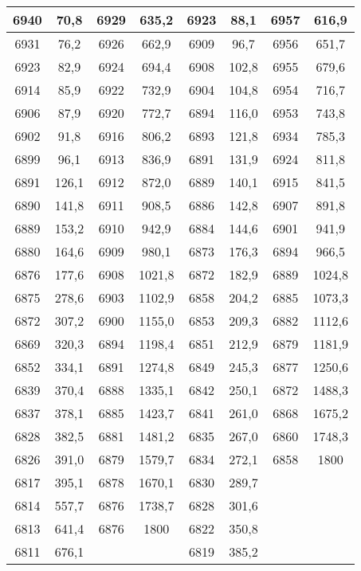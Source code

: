 \documentclass[11pt]{article}
\begin{document}
{{\begin{tabular}{|c|c|c|c|c|c|c|c|}
            \hline 
            6940 & 70,8 & 6929 & 635,2 & 6923 & 88,1 & 6957 & 616,9\tabularnewline
            \hline 
            6931 & 76,2 & 6926 & 662,9 & 6909 & 96,7 & 6956 & 651,7\tabularnewline
            \hline 
            6923 & 82,9 & 6924 & 694,4 & 6908 & 102,8 & 6955 & 679,6\tabularnewline
            \hline 
            6914 & 85,9 & 6922 & 732,9 & 6904 & 104,8 & 6954 & 716,7\tabularnewline
            \hline 
            6906 & 87,9 & 6920 & 772,7 & 6894 & 116,0 & 6953 & 743,8\tabularnewline
            \hline 
            6902 & 91,8 & 6916 & 806,2 & 6893 & 121,8 & 6934 & 785,3\tabularnewline
            \hline 
            6899 & 96,1 & 6913 & 836,9 & 6891 & 131,9 & 6924 & 811,8\tabularnewline
            \hline 
            6891 & 126,1 & 6912 & 872,0 & 6889 & 140,1 & 6915 & 841,5\tabularnewline
            \hline 
            6890 & 141,8 & 6911 & 908,5 & 6886 & 142,8 & 6907 & 891,8\tabularnewline
            \hline 
            6889 & 153,2 & 6910 & 942,9 & 6884 & 144,6 & 6901 & 941,9\tabularnewline
            \hline 
            6880 & 164,6 & 6909 & 980,1 & 6873 & 176,3 & 6894 & 966,5\tabularnewline
            \hline 
            6876 & 177,6 & 6908 & 1021,8 & 6872 & 182,9 & 6889 & 1024,8\tabularnewline
            \hline 
            6875 & 278,6 & 6903 & 1102,9 & 6858 & 204,2 & 6885 & 1073,3\tabularnewline
            \hline 
            6872 & 307,2 & 6900 & 1155,0 & 6853 & 209,3 & 6882 & 1112,6\tabularnewline
            \hline 
            6869 & 320,3 & 6894 & 1198,4 & 6851 & 212,9 & 6879 & 1181,9\tabularnewline
            \hline 
            6852 & 334,1 & 6891 & 1274,8 & 6849 & 245,3 & 6877 & 1250,6\tabularnewline
            \hline 
            6839 & 370,4 & 6888 & 1335,1 & 6842 & 250,1 & 6872 & 1488,3\tabularnewline
            \hline 
            6837 & 378,1 & 6885 & 1423,7 & 6841 & 261,0 & 6868 & 1675,2\tabularnewline
            \hline 
            6828 & 382,5 & 6881 & 1481,2 & 6835 & 267,0 & 6860 & 1748,3\tabularnewline
            \hline 
            6826 & 391,0 & 6879 & 1579,7 & 6834 & 272,1 & 6858 & 1800\tabularnewline
            \hline 
            6817 & 395,1 & 6878 & 1670,1 & 6830 & 289,7 & \multicolumn{1}{c}{} & \multicolumn{1}{c}{}\tabularnewline
            \cline{1-6} 
            6814 & 557,7 & 6876 & 1738,7 & 6828 & 301,6 & \multicolumn{1}{c}{} & \multicolumn{1}{c}{}\tabularnewline
            \cline{1-6} 
            6813 & 641,4 & 6876 & 1800 & 6822 & 350,8 & \multicolumn{1}{c}{} & \multicolumn{1}{c}{}\tabularnewline
            \cline{1-6} 
            6811 & 676,1 & \multicolumn{1}{c}{} &  & 6819 & 385,2 & \multicolumn{1}{c}{} & \multicolumn{1}{c}{}\tabularnewline

\end{tabular}}}
\end{document}
